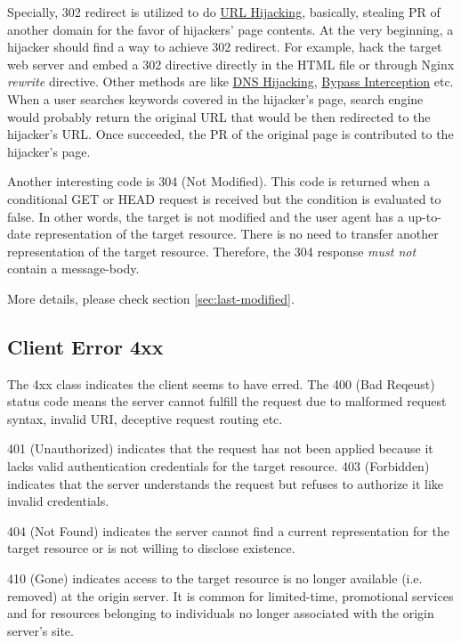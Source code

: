 Specially, 302 redirect is utilized to do
\href{https://en.ryte.com/wiki/URL_Hijacking}{URL Hijacking},
basically, stealing PR of another domain for the favor of
hijackers' page contents. At the very beginning, a hijacker should
find a way to achieve 302 redirect. For example, hack the target
web server and embed a 302 directive directly in the HTML file or
through Nginx \textit{rewrite} directive. Other methods are like
\href{https://blog.csdn.net/mgxcool/article/details/47206835}{DNS
  Hijacking},
\href{http://xsk.tehon.org/den/index.php/category/tech/tcp-bypass-hijacking-feature-and-recognization.html}{Bypass
  Interception} etc. When a user searches keywords covered in the
hijacker's page, search engine would probably return the original
URL that would be then redirected to the hijacker's URL. Once
succeeded, the PR of the original page is contributed to the
hijacker's page.

Another interesting code is 304 (Not Modified). This code is
returned when a conditional GET or HEAD request is received but
the condition is evaluated to false. In other words, the target is
not modified and the user agent has a up-to-date representation of
the target resource. There is no need to transfer another
representation of the target resource. Therefore, the 304 response
\textit{must not} contain a message-body.

More details,
please check section \ref{sec:last-modified}.

\subsection{Client Error 4xx}
\label{sec:client-error-4xx}

The 4xx class indicates the client seems to have erred. The 400
(Bad Reqeust) status code means the server cannot fulfill the request due to
malformed request syntax, invalid URI, deceptive request routing
etc.

401 (Unauthorized) indicates that the request has not been applied
because it lacks valid authentication credentials for the target
resource. 403 (Forbidden) indicates that the server understands
the request but refuses to authorize it like invalid credentials.

404 (Not Found) indicates the server cannot find a
current representation for the target resource or is not willing
to disclose existence.

410 (Gone) indicates access to the target resource is no longer
available (i.e. removed) at the origin server. It is common for
limited-time, promotional services and for resources belonging to
individuals no longer associated with the origin server's site.

